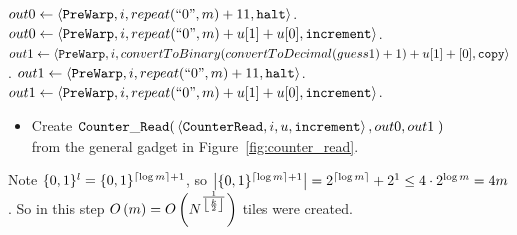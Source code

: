 \begin{itemize}
\begin{algorithm}
\begin{algorithmic}[1]
                \Else
                        \State $out0 \gets \left\langle {\tt PreWarp}, i, repeat(``0", m) + 11, {\tt halt} \right\rangle$.
                    \Else
                        \State $out0 \gets \left\langle {\tt PreWarp}, i, repeat(``0", m) + u[1] + u[0], {\tt increment} \right\rangle$.
                    \EndIf
                \EndIf
                    \State $out1 \gets \left\langle {\tt PreWarp}, i, convertToBinary(convertToDecimal(guess1) + 1) + u[1] + [0], {\tt copy} \right\rangle$.
                \Else
                        \State $out1 \gets \left\langle {\tt PreWarp}, i, repeat(``0", m) + 11, {\tt halt} \right\rangle$.
                    \Else
                        \State $out1 \gets \left\langle {\tt PreWarp}, i, repeat(``0", m) + u[1] + u[0], {\tt increment} \right\rangle$.
                    \EndIf
                \EndIf
            \EndFunction
        \end{algorithmic}
    \end{algorithm}

    \begin{itemize}
        \item
        Create $\begin{aligned}[t]
                   \cread(& \left\langle {\tt CounterRead}, i, u, {\tt increment} \right\rangle, out0, out1 \;)
               \end{aligned}$\\from the general gadget in Figure~\ref{fig:counter_read}.
    \end{itemize}
    Note $\{0, 1 \}^l = \{0, 1\}^{\ceil*{\log m} + 1}$, so $\left| {\{0, 1\}^{\ceil*{\log m} + 1}} \right| = 2^{\ceil*{\log m}} + 2^1 \leq 4 \cdot 2^{\log m} = 4m$.
    So in this step $O\left(m \right) = O\left( \upperbound \right)$ tiles were created.

\end{itemize}

